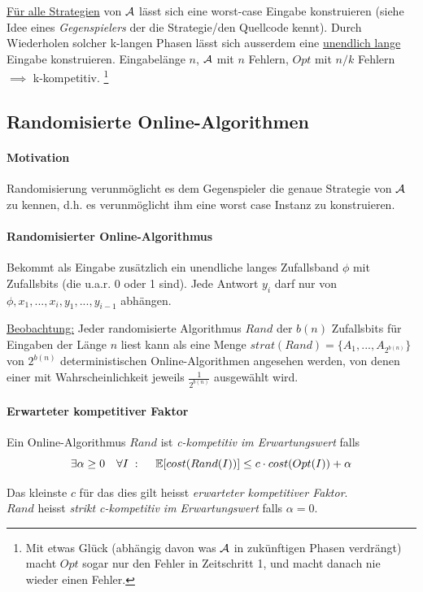 \underline{Für alle Strategien} von $\mathcal{A}$ lässt sich eine worst-case Eingabe konstruieren (siehe Idee
eines \emph{Gegenspielers} der die Strategie/den Quellcode kennt).
Durch Wiederholen solcher k-langen Phasen lässt sich ausserdem eine \underline{unendlich lange}
Eingabe konstruieren.
Eingabelänge $n$, $\mathcal{A}$ mit $n$ Fehlern, $Opt$ mit $n/k$ Fehlern $\implies$ k-kompetitiv.
\footnote{Mit etwas Glück (abhängig davon was $\mathcal{A}$ in zukünftigen Phasen verdrängt)
macht $Opt$ sogar nur den Fehler in Zeitschritt 1, und macht danach nie wieder einen Fehler.}


\subsection{Randomisierte Online-Algorithmen}

\paragraph{Motivation}
Randomisierung verunmöglicht es dem Gegenspieler die genaue Strategie von $\mathcal{A}$ zu kennen,
d.h. es verunmöglicht ihm eine worst case Instanz zu konstruieren.

\paragraph{Randomisierter Online-Algorithmus}
Bekommt als Eingabe zusätzlich ein unendliche langes Zufallsband $\phi$ mit Zufallsbits
(die u.a.r. 0 oder 1 sind).
Jede Antwort $y_i$ darf nur von $ \phi, x_1, ..., x_i, y_1, ..., y_{i-1} $ abhängen.

\underline{Beobachtung:}
Jeder randomisierte Algorithmus $Rand$ der $b(n)$ Zufallsbits für Eingaben der Länge $n$ liest
kann als eine Menge $ strat(Rand) = \{ A_1, ..., A_{2^{b(n)}} \} $ von $2^{b(n)}$ deterministischen
Online-Algorithmen angesehen werden, von denen einer mit Wahrscheinlichkeit jeweils $\frac{1}{2^{b(n)}}$
ausgewählt wird.

\paragraph{Erwarteter kompetitiver Faktor}
Ein Online-Algorithmus $Rand$ ist \emph{c-kompetitiv im Erwartungswert} falls
$$ \exists \alpha \geq 0 \quad \forall I \; : \; \quad
\mathbb{E} [ cost(Rand(I)) ] \leq c \cdot cost(Opt(I)) + \alpha $$

Das kleinste $c$ für das dies gilt heisst \emph{erwarteter kompetitiver Faktor}. \\
$Rand$ heisst \emph{strikt c-kompetitiv im Erwartungswert} falls $\alpha = 0$.

